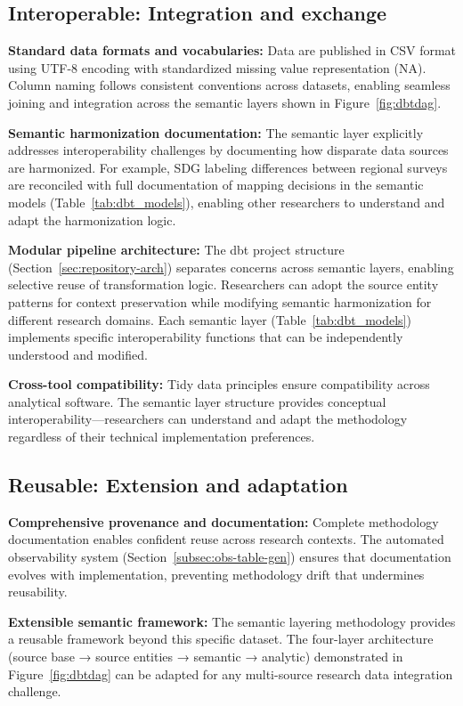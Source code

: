 \documentclass{article}
\begin{document}
\subsection{Interoperable: Integration and exchange}

\textbf{Standard data formats and vocabularies:} Data are published in CSV format \cite{csv_rfc} using UTF-8 encoding with standardized missing value representation (NA). Column naming follows consistent conventions across datasets, enabling seamless joining and integration across the semantic layers shown in Figure~\ref{fig:dbtdag}.

\textbf{Semantic harmonization documentation:} The semantic layer explicitly addresses interoperability challenges by documenting how disparate data sources are harmonized. For example, SDG labeling differences between regional surveys are reconciled with full documentation of mapping decisions in the semantic models (Table~\ref{tab:dbt_models}), enabling other researchers to understand and adapt the harmonization logic.

\textbf{Modular pipeline architecture:} The dbt project structure (Section~\ref{sec:repository-arch}) separates concerns across semantic layers, enabling selective reuse of transformation logic. Researchers can adopt the source entity patterns for context preservation while modifying semantic harmonization for different research domains. Each semantic layer (Table~\ref{tab:dbt_models}) implements specific interoperability functions that can be independently understood and modified.

\textbf{Cross-tool compatibility:} Tidy data principles ensure compatibility across analytical software. The semantic layer structure provides conceptual interoperability—researchers can understand and adapt the methodology regardless of their technical implementation preferences.

\subsection{Reusable: Extension and adaptation}

\textbf{Comprehensive provenance and documentation:} Complete methodology documentation enables confident reuse across research contexts. The automated observability system (Section~\ref{subsec:obs-table-gen}) ensures that documentation evolves with implementation, preventing methodology drift that undermines reusability.

\textbf{Extensible semantic framework:} The semantic layering methodology provides a reusable framework beyond this specific dataset. The four-layer architecture (source base → source entities → semantic → analytic) demonstrated in Figure~\ref{fig:dbtdag} can be adapted for any multi-source research data integration challenge.
\end{document}
